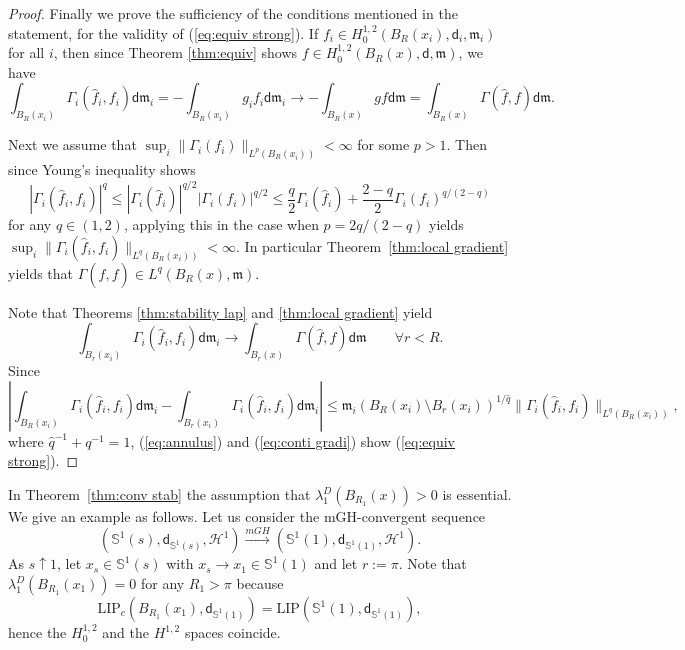 \documentclass[a4paper,11pt,reqno]{article}
\numberwithin{equation}{section}
\theoremstyle{plain}
\theoremstyle{definition}
\theoremstyle{remark}
\newcommand{\dist}{\mathsf{d}}
\newcommand{\meas}{\mathfrak{m}}
\begin{document}
{\begin{proof}
Finally we prove the sufficiency of the conditions mentioned in the statement, for the validity of (\ref{eq:equiv strong}).
If $f_i \in H^{1, 2}_0(B_R(x_i), \dist_i, \meas_i)$ for all $i$, then since Theorem \ref{thm:equiv} shows $f \in H^{1, 2}_0(B_R(x), \dist, \meas)$, we have
$$
\int_{B_R(x_i)}\Gamma_i( \hat{f}_i, f_i) \dist \meas_i=
-\int_{B_R(x_i)}g_if_i\dist \meas_i \to -\int_{B_R(x)}gf\dist \meas=\int_{B_R(x)}\Gamma( \hat{f}, f) \dist \meas.
$$

Next we assume that $\sup_i\|\Gamma_i(f_i)\|_{L^p(B_R(x_i))}<\infty$ for some $p>1$.
Then since Young's inequality shows
$$
|\Gamma_i(\hat{f}_i,f_i )|^q \le |\Gamma_i(\hat{f}_i)|^{q/2}|\Gamma_i(f_i)|^{q/2} \le 
\frac{q}{2}\Gamma_i(\hat{f}_i) + \frac{2-q}{2}\Gamma_i(f_i)^{q/(2-q)}
$$
for any $q \in (1, 2)$, applying this in the case when $p=2q/(2-q)$ yields $\sup_i\|\Gamma_i(\hat{f}_i,  f_i )\|_{L^q(B_R(x_i))}<\infty$. 
In particular Theorem~\ref{thm:local gradient} yields that $\Gamma( \hat{f},  f) \in L^q(B_R(x), \meas)$.

Note that Theorems \ref{thm:stability lap} and \ref{thm:local gradient} yield
\begin{equation}\label{eq:conti gradi}
\int_{B_r(x_i)}\Gamma_i(\hat{f}_i,  f_i) \dist \meas_i \to \int_{B_r(x)}\Gamma(\hat{f}, f)\dist \meas\qquad \forall r<R.
\end{equation}
Since 
$$
\left| \int_{B_R(x_i)}\Gamma_i(\hat{f}_i, f_i) \dist \meas_i-\int_{B_r(x_i)}\Gamma_i(\hat{f}_i, f_i)\dist \meas_i\right| \le 
\meas_i(B_R(x_i) \setminus B_r(x_i))^{1/\hat{q}} \|\Gamma_i(\hat{f}_i,  f_i)\|_{L^q(B_R(x_i))},
$$
where $\hat{q}^{-1}+q^{-1}=1$, (\ref{eq:annulus}) and (\ref{eq:conti gradi}) show (\ref{eq:equiv strong}).
\end{proof}

\begin{remark}\label{rem:example}
In Theorem~\ref{thm:conv stab} the assumption that $\lambda_1^D(B_{R_1}(x))>0$ is essential. We give an example as follows. 
Let us consider the mGH-convergent sequence 
$$
(\mathbb{S}^1(s), \dist_{\mathbb{S}^1(s)}, \mathcal{H}^1) \stackrel{mGH}{\to} 
(\mathbb{S}^1(1), \dist_{\mathbb{S}^1(1)}, \mathcal{H}^1).
$$
As $s \uparrow 1$, let $x_s \in \mathbb{S}^1(s)$ with $x_s \to x_1 \in \mathbb{S}^1(1)$ and let $r:=\pi$.
Note that $\lambda^D_1(B_{R_1}(x_1))=0$ for any $R_1>\pi$ because 
$$
\mathrm{LIP}_c(B_{R_1}(x_1), \dist_{\mathbb{S}^1(1)})=
\mathrm{LIP}(\mathbb{S}^1(1), \dist_{\mathbb{S}^1(1)}),
$$
hence the $H^{1,2}_0$ and the $H^{1,2}$ spaces coincide.


\end{remark}}
\end{document}
